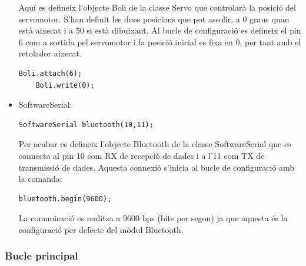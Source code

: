 \begin{itemize}
	Aquí es defineix l’objecte Boli de la classe Servo que controlarà la posició del servomotor. S’han definit les dues posicions que pot assolir, a 0 graus quan està aixecat i a 50 si està dibuixant. Al bucle de configuració es defineix el pin 6 com a sortida pel servomotor i la posició inicial es fixa en 0, per tant amb el retolador aixecat.
	\begin{lstlisting}[style=Arduino]
	Boli.attach(6);
	Boli.write(0);
	\end{lstlisting}
	
	\item SoftwareSerial:
	\begin{lstlisting}[style=Arduino]
	SoftwareSerial bluetooth(10,11);
	\end{lstlisting}

	Per acabar es defineix l’objecte Bluetooth de la classe SoftwareSerial que es connecta al pin 10 com RX de recepció de dades i a l’11 com TX de transmissió de dades. Aquesta connexió s’inicia al bucle de configuració amb la comanda: 
	\begin{lstlisting}[style=Arduino]
	bluetooth.begin(9600);
	\end{lstlisting}

	La comunicació es realitza a 9600 bps (bits per segon) ja que aquesta és la configuració per defecte del mòdul Bluetooth. 
	
	
\end{itemize}


\subsubsection{Bucle principal}

